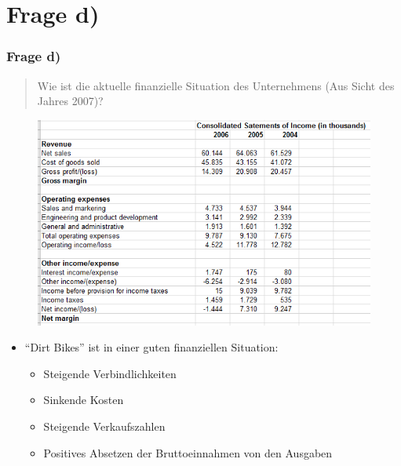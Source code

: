 \documentclass{beamer}
\begin{document}
\section{Frage d)}
\begin{frame}
\frametitle{Frage d)}

\begin{quote}
Wie ist die aktuelle finanzielle Situation des Unternehmens (Aus Sicht des Jahres 2007)?
\end{quote}

\begin{figure}
\includegraphics[scale=0.34]{financials.PNG}
\end{figure}

\begin{itemize}
\setlength{\itemsep}{14pt}
\item ``Dirt Bikes'' ist in einer guten finanziellen Situation:
\begin{itemize}
\item Steigende Verbindlichkeiten
\item Sinkende Kosten
\item Steigende Verkaufszahlen
\item Positives Absetzen der Bruttoeinnahmen von den Ausgaben
\end{itemize}
\end{itemize}

\end{frame}
\end{document}
